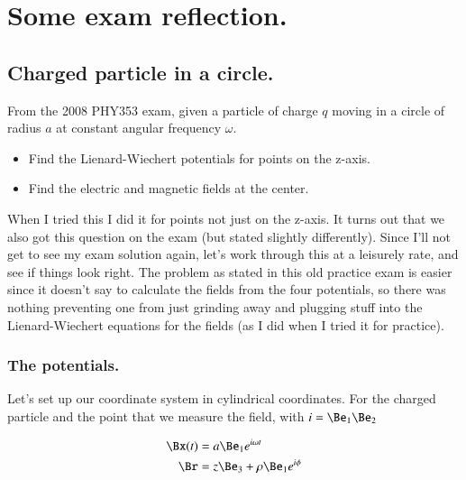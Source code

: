 %
%

\chapter{Some exam reflection.}
\label{chap:relativisticElectrodynamicsExamReflection}
{}
\date{April 13, 2011}

\beginArtWithToc

\section{Charged particle in a circle.}

From the 2008 PHY353 exam, given a particle of charge $q$ moving in a circle of radius $a$ at constant angular frequency $\omega$.

\begin{itemize}
\item Find the Lienard-Wiechert potentials for points on the z-axis.
\item Find the electric and magnetic fields at the center.
\end{itemize}

When I tried this I did it for points not just on the z-axis.  It turns out that we also got this question on the exam (but stated slightly differently).  Since I'll not get to see my exam solution again, let's work through this at a leisurely rate, and see if things look right.  The problem as stated in this old practice exam is easier since it doesn't say to calculate the fields from the four potentials, so there was nothing preventing one from just grinding away and plugging stuff into the Lienard-Wiechert equations for the fields (as I did when I tried it for practice).

\subsection{The potentials.}

Let's set up our coordinate system in cylindrical coordinates.  For the charged particle and the point that we measure the field, with $i = \Be_1 \Be_2$

\begin{align}\label{eqn:relativisticElectrodynamicsExamReflection:10}
\Bx(t) &= a \Be_1 e^{i \omega t} \\
\Br &= z \Be_3 + \rho \Be_1 e^{i \phi}
\end{align}

